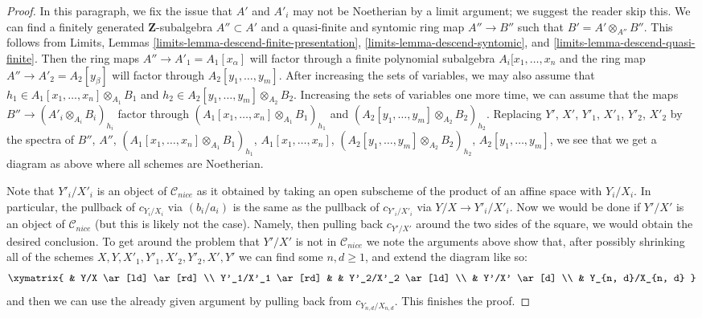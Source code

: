\documentclass[10pt,a4paper]{amsart}
\theoremstyle{plain}
\theoremstyle{definition}
\theoremstyle{remark}
\numberwithin{equation}{subsection}
\begin{document}
\begin{proof}
\medskip\noindent
In this paragraph, we fix the issue that $A'$ and $A'_i$ may not be Noetherian
by a limit argument; we suggest the reader skip this.
We can find a finitely generated $\mathbf{Z}$-subalgebra
$A'' \subset A'$ and a quasi-finite and syntomic ring map
$A'' \to B''$ such that $B' = A' \otimes_{A''} B''$.
This follows from Limits, Lemmas
\ref{limits-lemma-descend-finite-presentation},
\ref{limits-lemma-descend-syntomic}, and
\ref{limits-lemma-descend-quasi-finite}.
Then the ring maps $A'' \to A'_1 = A_1[x_\alpha]$ will factor through a finite
polynomial subalgebra $A_i[x_1, \ldots, x_n$ and the ring map
$A'' \to A'_2 = A_2[y_\beta]$ will factor through $A_2[y_1, \ldots, y_m]$.
After increasing the sets of variables, we may also assume that
$h_1 \in A_1[x_1, \ldots, x_n] \otimes_{A_1} B_1$ and
$h_2 \in A_2[y_1, \ldots, y_m] \otimes_{A_2} B_2$.
Increasing the sets of variables one more time, we can assume
that the maps $B'' \to (A'_i \otimes_{A_i} B_i)_{h_i}$
factor through $(A_1[x_1, \ldots, x_n] \otimes_{A_1} B_1)_{h_1}$
and $(A_2[y_1, \ldots, y_m] \otimes_{A_2} B_2)_{h_2}$.
Replacing $Y'$, $X'$, $Y'_1$, $X'_1$, $Y'_2$, $X'_2$ by the spectra of
$B''$, $A''$, $(A_1[x_1, \ldots, x_n] \otimes_{A_1} B_1)_{h_1}$,
$A_1[x_1, \ldots, x_n]$, $(A_2[y_1, \ldots, y_m] \otimes_{A_2} B_2)_{h_2}$,
$A_2[y_1, \ldots, y_m]$, we see that we get a diagram as above
where all schemes are Noetherian.

\medskip\noindent
Note that $Y'_i/X'_i$ is an object of $\mathcal{C}_{nice}$ as it
obtained by taking an open subscheme of the product of an affine space
with $Y_i/X_i$. In particular, the pullback of
$c_{Y_i/X_i}$ via $(b_i/a_i)$ is the same as the pullback of
$c_{Y'_i/X'_i}$ via $Y/X \to Y'_i/X'_i$.
Now we would be done if $Y'/X'$ is an object of $\mathcal{C}_{nice}$
(but this is likely not the case). Namely, then pulling back $c_{Y'/X'}$
around the two sides of the square, we would obtain the desired conclusion.
To get around the problem that $Y'/X'$ is not in $\mathcal{C}_{nice}$
we note the arguments above show that, after possibly shrinking all
of the schemes $X, Y, X'_1, Y'_1, X'_2, Y'_2, X', Y'$ we can find some
$n, d \geq 1$, and extend the diagram like so:
$$
\xymatrix{
& Y/X \ar[ld] \ar[rd] \\
Y'_1/X'_1 \ar[rd] & & Y'_2/X'_2 \ar[ld] \\
& Y'/X' \ar[d] \\
& Y_{n, d}/X_{n, d}
}
$$
and then we can use the already given argument by pulling
back from $c_{Y_{n, d}/X_{n, d}}$. This finishes the proof.
\end{proof}



\end{document}
